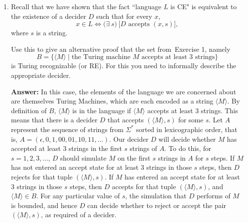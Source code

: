 \documentclass[11pt]{article}
\begin{document}
\begin{enumerate}[label=\textbf{Exercise \arabic{*}}]
        \bigskip

  \item

        Recall that we have shown that the fact ``language $L$  is CE" is equivalent to the existence of a decider  $D $ such that for every $x$,
        \[x \in L \Leftrightarrow \big(\exists~s) ~ \big[D \mbox{ accepts $(x,s)$}\big],
        \]
        where  $s$ is a string.


        Use this to give an alternative proof that the set from~Exercise 1, namely
        \[
          B = \{\langle M \rangle \mid \mbox{the Turing machine $M$ accepts at least $3$ strings}\}
        \]  is
        Turing recognizable (or RE).
        For this you need to informally describe the appropriate decider.

        \medskip

        \textbf{Answer:}
        In this case, the elements of the language we are concerned about are themselves Turing Machines, which are each encoded as a string $\langle M \rangle$. By definition of $B$, $\langle M \rangle$ is in the language if $\langle M \rangle$ accepts at least $3$ strings. This means that there is a decider $D$ that accepts $(\langle M \rangle, s)$ for some $s$. Let $A$ represent the sequence of strings from $\Sigma^*$ sorted in lexicographic order, that is, $A = (\epsilon, 0, 1, 00, 01, 10, 11, \ldots)$. Our decider $D$ will decide whether $M$ has accepted at least $3$ strings in the first $s$ strings of $A$. To do this, for $s = 1, 2, 3, \ldots$, $D$ should simulate $M$ on the first $s$ strings in $A$ for $s$ steps. If $M$ has not entered an accept state for at least 3 strings in those $s$ steps, then $D$ rejects for that tuple $(\langle M \rangle, s)$. If $M$ has entered an accept state for at least 3 strings in those $s$ steps, then $D$ accepts for that tuple $(\langle M \rangle, s)$, and $\langle M \rangle \in B$. For any particular value of $s$, the simulation that $D$ performs of $M$ is bounded, and hence $D$ can decide whether to reject or accept the pair $(\langle M \rangle, s)$, as required of a decider.


\end{enumerate}
\end{document}
